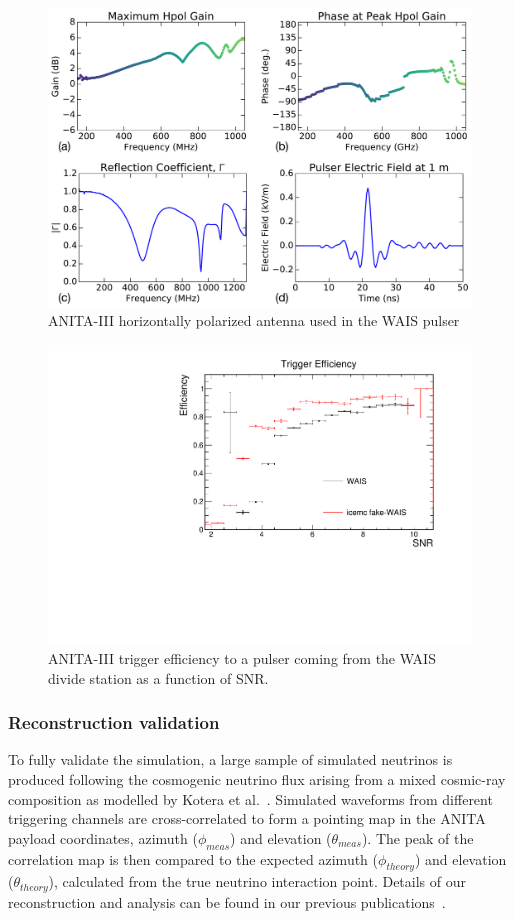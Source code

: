 \begin{figure}
\centering
\includegraphics[width=\linewidth]{./Figs/waisPulser.pdf}
\caption{ANITA-III horizontally polarized antenna used in the WAIS pulser}
\label{fig:waisPulser}
\end{figure}

\begin{figure}
\centering
\includegraphics[width=.5\linewidth]{./Figs/Efficiency_WAIS.pdf}
\caption{ANITA-III trigger efficiency to a pulser coming from the WAIS divide station as a function of SNR.}
\label{fig:waisEff}
\end{figure}

\subsubsection{Reconstruction validation}
\label{subsec:ANITA_validation_reconstruction}
To fully validate the simulation, a large sample of simulated
neutrinos is produced following the cosmogenic neutrino flux arising from a mixed cosmic-ray composition as modelled by Kotera et al.~\cite{kotera}.
Simulated waveforms from different triggering channels are
cross-correlated to form a pointing map in the ANITA payload
coordinates, azimuth ($\phi_{meas}$) and elevation
($\theta_{meas}$). 
The peak of the correlation map is then compared to the expected
azimuth ($\phi_{theory}$) and elevation
($\theta_{theory}$), calculated from the true neutrino interaction point.
Details of our reconstruction and analysis can be found in our
previous publications~\cite{ANITA1paper,ANITA2paper,romero2015interferometric}.

